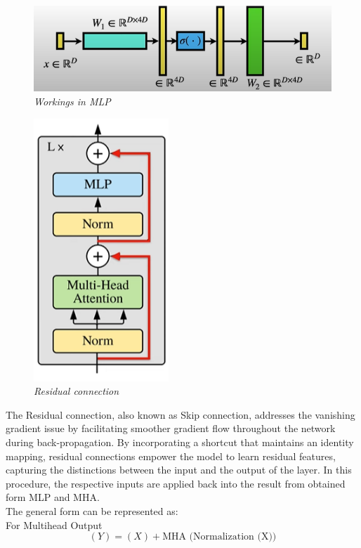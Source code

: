 \begin{figure}[htbp]
    \centering
    \includegraphics[width=5in]{img/MLP workings.png}
    \caption{\textit{Workings in MLP}}
\end{figure}
\newpage
\begin{figure}[htbp]
    \centering
    \includegraphics[width=2in]{img/residual connection.png}
    \caption{\textit{Residual connection}}
\end{figure}
The Residual connection, also known as Skip connection, addresses the vanishing gradient issue by facilitating smoother gradient flow throughout the network during back-propagation. By incorporating a shortcut that maintains an identity mapping, residual connections empower the model to learn residual features, capturing the distinctions between the input and the output of the layer. In this procedure, the respective inputs are applied back into the result from obtained form MLP and MHA.\\

The general form can be represented as:\\

For Multihead Output\\
\[(Y) = (X)+\text{MHA (Normalization (X))}\]

